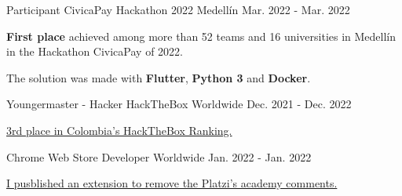 
\begin{cventries}
  \cventry
  {Participant} %
  {CivicaPay Hackathon 2022} %
  {Medellín} %
  {Mar. 2022 - Mar. 2022} %
  {
    \begin{cvitems} %
      \item {\textbf{First place} achieved among more than 52 teams and 16 universities in
                  Medellín in the Hackathon CivicaPay of 2022.}
      \item {The solution was made with \textbf{Flutter}, \textbf{Python 3} and \textbf{Docker}.}
    \end{cvitems}
  }

  \cventry
  {Youngermaster - Hacker} %
  {HackTheBox} %
  {Worldwide} %
  {Dec. 2021 - Dec. 2022} %
  {
    \begin{cvitems} %
      \item {\href{https://app.hackthebox.com/profile/643960}{3rd place in Colombia's HackTheBox Ranking.}}
    \end{cvitems}
  }

  \cventry
  {Chrome Web Store} %
  {Developer} %
  {Worldwide} %
  {Jan. 2022 - Jan. 2022} %
  {
    \begin{cvitems} %
      \item {\href{https://chrome.google.com/webstore/detail/platzi-community-wrapper/dakgbbfpefoofghfbkopnbnpadeblbep}
                  {I pusblished an extension to remove the Platzi's academy comments.}}
    \end{cvitems}
  }


\end{cventries}
